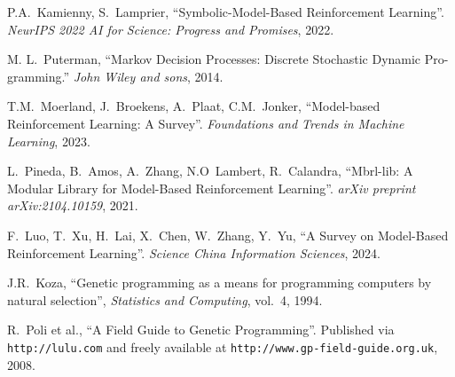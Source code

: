 \documentclass[11pt]{article}
\begin{document}

\begin{thebibliography}{10}
	P.A.~Kamienny, S.~Lamprier, ``Symbolic-Model-Based Reinforcement Learning''.
	{\em NeurIPS 2022 AI for Science: Progress and Promises}, 2022.
	
	M. L.~Puterman, ``Markov Decision Processes: Discrete Stochastic Dynamic Pro-
	gramming.'' {\em John Wiley and sons}, 2014.
	
	T.M.~Moerland, J.~Broekens, A.~Plaat, C.M.~Jonker, ``Model-based Reinforcement Learning: A Survey''. {\em Foundations and Trends in Machine Learning}, 2023.
	
	L.~Pineda, B.~Amos, A.~Zhang, N.O~Lambert, R.~Calandra, ``Mbrl-lib: A Modular Library for Model-Based Reinforcement Learning''. {\em arXiv preprint arXiv:2104.10159}, 2021.
	
	F.~Luo, T.~Xu, H.~Lai, X.~Chen, W.~Zhang, Y.~Yu, ``A Survey on Model-Based Reinforcement Learning''. {\em Science China Information Sciences}, 2024.
	
	J.R.~Koza, ``Genetic programming as a means for programming computers by natural selection'', 
	{\em Statistics and Computing}, vol.~4, 1994.
	
	R.~Poli et al., ``A Field Guide to Genetic Programming''.
	\newblock Published via \texttt{http://lulu.com} and freely available at \texttt{http://www.gp-field-guide.org.uk}, 2008.
	
\end{thebibliography}
\end{document}
